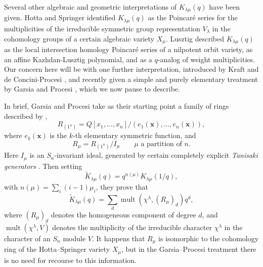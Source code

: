 \documentclass[12pt]{article}
\newcommand{\KK}{\tilde{K}}
\newcommand{\x}{\mathbf{x}}
\newcommand{\mult}{\operatorname{mult}}
\numberwithin{equation}{section}
\theoremstyle{plain}
\theoremstyle{definition}
\theoremstyle{remark}
\begin{document}
Several other algebraic and geometric interpretations of $K_{\lambda
\mu }(q)$ have been given.  Hotta and Springer \cite{Hotta&Springer}
identified $K_{\lambda \mu }(q)$ as the Poincar\'e series for the
multiplicities of the irreducible symmetric group representation
$V_{\lambda }$ in the cohomology groups of a certain algebraic variety
$X_{\mu }$.  Lusztig \cite{Lusztig81, Lusztig83} described $K_{\lambda
\mu }(q)$ as the local intersection homology Poincar\'e series of a
nilpotent orbit variety, as an affine Kazhdan-Lusztig polynomial, and
as a $q$-analog of weight multiplicities.  Our concern here will be
with one further interpretation, introduced by Kraft and de
Concini-Procesi \cite{Kraft,deConcini&Procesi}, and recently given a
simple and purely elementary treatment by Garsia and Procesi
\cite{Garsia&Procesi}, which we now pause to describe.

In brief, Garsia and Procesi take as their starting point a family of
rings described by \cite{Kraft,deConcini&Procesi},
\begin{equation}\label{e:R1n}
R_{(1^{n})} = Q[x_{1},\ldots,x_{n}]/(e_{1}(\x),\ldots,e_{n}(\x)),
\end{equation}
where $e_{k}(\x)$ is the $k$-th elementary symmetric function, and 
\begin{equation}\label{e:Rmu}
R_{\mu } = R_{(1^{n})}/I_{\mu } \qquad \text{$\mu$ a partition of $n$.}
\end{equation}
Here $I_{\mu }$ is an $S_{n}$-invariant ideal, generated by certain
completely explicit {\it Tanisaki generators} \cite{Tanisaki}.  Then
setting
\begin{equation}\label{e:Ktilde}
\KK_{\lambda \mu }(q) = q^{n(\mu )} K_{\lambda \mu }(1/q),
\end{equation}
with $n(\mu ) = \sum _{i}(i-1)\mu _{i}$, they prove that
\begin{equation}\label{e:Kinterpretation}
\KK_{\lambda \mu }(q) = \sum _{d} \mult (\chi ^{\lambda }, (R_{\mu
})_{d}) q^{d},
\end{equation}
where $(R_{\mu })_{d}$ denotes the homogeneous component of degree
$d$, and $\mult(\chi ^{\lambda }, V)$ denotes the multiplicity of the
irreducible character $\chi ^{\lambda }$ in the character of an
$S_{n}$ module $V$.  It happens that $R_{\mu }$ is isomorphic to the
cohomology ring of the Hotta--Springer variety $X_{\mu }$, but in the
Garsia--Procesi treatment there is no need for recourse to this
information.
\end{document}
